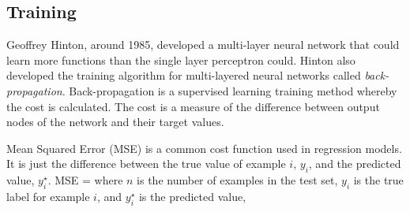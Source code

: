 \subsection{Training}


Geoffrey Hinton, around 1985, developed a multi-layer neural network that could learn more functions than the single layer perceptron could\citep{mo2012survey}\citep{williams1986learning}.
Hinton also developed the training algorithm for multi-layered neural networks called \textit{back-propagation}\cite{mcclelland1986parallel}.
Back-propagation is a supervised learning training method whereby the cost is calculated.
The cost is a measure of the difference between output nodes of the network and their target values.

Mean Squared Error (MSE) is a common cost function used in regression models.
It is just the difference between the true value of example $i$, $y_i$, and the predicted value, $y_i^\star$.
\be
MSE =  
\ee
where $n$ is the number of examples in the test set, $y_i$ is the true label for example $i$, and $y_i^\star$ is the predicted value,

